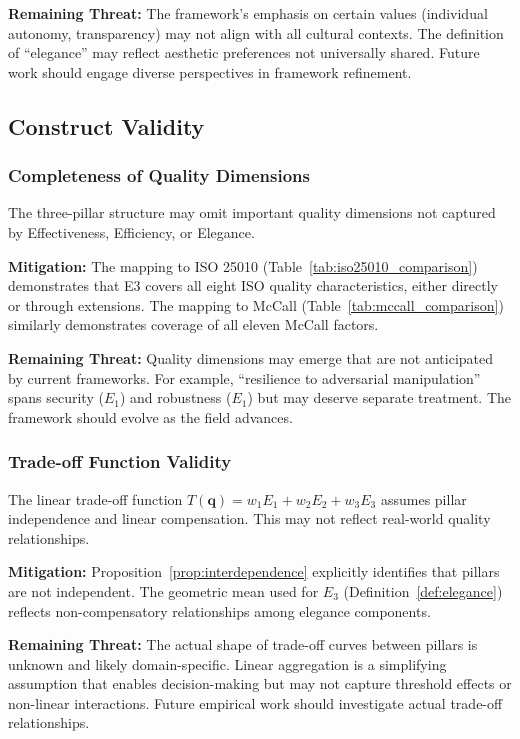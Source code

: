 \textbf{Remaining Threat:} The framework's emphasis on certain values (individual autonomy, transparency) may not align with all cultural contexts. The definition of ``elegance'' may reflect aesthetic preferences not universally shared. Future work should engage diverse perspectives in framework refinement.

\subsection{Construct Validity}

\subsubsection{Completeness of Quality Dimensions}

The three-pillar structure may omit important quality dimensions not captured by Effectiveness, Efficiency, or Elegance.

\textbf{Mitigation:} The mapping to ISO 25010 (Table~\ref{tab:iso25010_comparison}) demonstrates that E3 covers all eight ISO quality characteristics, either directly or through extensions. The mapping to McCall (Table~\ref{tab:mccall_comparison}) similarly demonstrates coverage of all eleven McCall factors.

\textbf{Remaining Threat:} Quality dimensions may emerge that are not anticipated by current frameworks. For example, ``resilience to adversarial manipulation'' spans security ($E_1$) and robustness ($E_1$) but may deserve separate treatment. The framework should evolve as the field advances.

\subsubsection{Trade-off Function Validity}

The linear trade-off function $T(\mathbf{q}) = w_1 E_1 + w_2 E_2 + w_3 E_3$ assumes pillar independence and linear compensation. This may not reflect real-world quality relationships.

\textbf{Mitigation:} Proposition~\ref{prop:interdependence} explicitly identifies that pillars are not independent. The geometric mean used for $E_3$ (Definition~\ref{def:elegance}) reflects non-compensatory relationships among elegance components.

\textbf{Remaining Threat:} The actual shape of trade-off curves between pillars is unknown and likely domain-specific. Linear aggregation is a simplifying assumption that enables decision-making but may not capture threshold effects or non-linear interactions. Future empirical work should investigate actual trade-off relationships.

